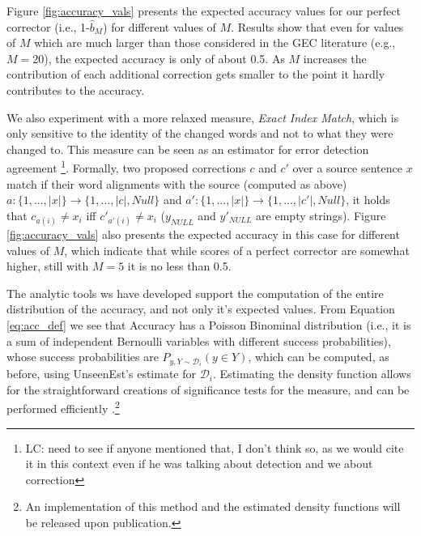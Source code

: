 \documentclass[letter,11pt]{article}
\newcommand{\lc}[1]{\footnote{\color{blue}LC: #1}}
\begin{document}
Figure \ref{fig:accuracy_vals} presents the expected accuracy values for our perfect
corrector (i.e., 1-$\hat{b}_M$) for different values of $M$. 
Results show that even for values of $M$ which are much larger than those considered in the GEC literature (e.g., $M=20$), the expected accuracy is only of about 0.5. {\color{red} As $M$ increases the contribution of each additional correction gets smaller to the point it hardly contributes to the accuracy.}

We also experiment with a more relaxed measure, {\it Exact Index Match}, which is only sensitive
to the identity of the changed words and not to what they were changed to. {\color{red} This measure can be seen as an estimator for error detection agreement \lc{need to see if anyone mentioned that, I don't think so, as we would cite it in this context even if he was talking about detection and we about correction}.}
Formally, two proposed corrections $c$ and $c'$ over a source sentence $x$ match
if their word alignments with the source (computed as above) $a:\{1,...,|x|\} \rightarrow \{1,...,\left|c\right|,Null\}$
and $a':\{1,...,\left|x\right|\} \rightarrow \{1,...,\left|c'\right|,Null\}$, it holds that $c_{a\left(i\right)} \neq x_{i}$ iff $c'_{a'\left(i\right)} \neq x_{i}$ ($y_{NULL}$ and $y'_{NULL}$ are empty strings).
Figure \ref{fig:accuracy_vals} also presents the expected accuracy in this case
for different values of $M$, which indicate that while scores of a perfect corrector are somewhat higher,
still with $M=5$ it is no less than 0.5.

	

The analytic tools ws have developed support the computation of the entire distribution of the accuracy,
and not only it's expected values. From Equation \ref{eq:acc_def} we see that Accuracy has a Poisson Binominal distribution (i.e., it is a sum of independent Bernoulli variables with different success probabilities), whose success probabilities are $P_{y,Y \sim \mathcal{D}_i}(y \in Y)$, which can be computed, as before, using {\sc UnseenEst}'s estimate for $\mathcal{D}_i$. Estimating the density function allows for the straightforward creations of significance tests for the measure, and can be performed efficiently \cite{hong2013computing}.\footnote{An implementation of this method and the estimated density functions will be released upon publication.}
\end{document}
